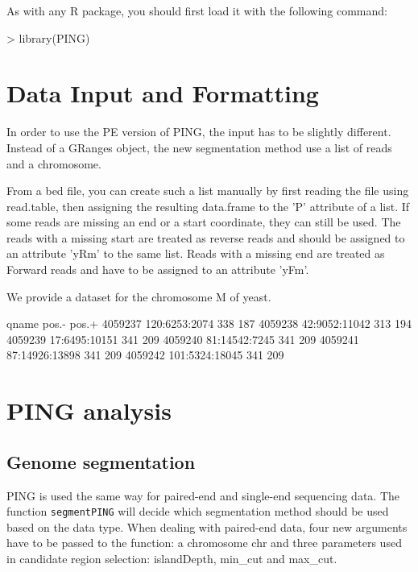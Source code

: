 \documentclass[11pt]{article}
\begin{document}
As with any R package, you should first load it with the following command:

\begin{Schunk}
\begin{Sinput}
> library(PING)
\end{Sinput}
\end{Schunk}

\section{Data Input and Formatting}
In order to use the PE version of PING, the input has to be slightly different.
Instead of a GRanges object, the new segmentation method use a list of reads and
a chromosome.

From a bed file, you can create such a list manually by first reading the file
using read.table, then assigning the resulting data.frame to the 'P' attribute
of a list. If some reads are missing an end or a start coordinate, they can
still be used. The reads with a missing start are treated as reverse reads and
should be assigned to an attribute 'yRm' to the same list. Reads with a missing
end are treated as Forward reads and have to be assigned to an attribute 'yFm'.

We provide a dataset for the chromosome M of yeast.
\begin{Schunk}
\begin{Soutput}
                 qname pos.- pos.+
4059237  120:6253:2074   338   187
4059238  42:9052:11042   313   194
4059239  17:6495:10151   341   209
4059240  81:14542:7245   341   209
4059241 87:14926:13898   341   209
4059242 101:5324:18045   341   209
\end{Soutput}
\end{Schunk}


\section{PING analysis}

\subsection{Genome segmentation}
PING is used the same way for paired-end and single-end sequencing data. The
function \texttt{segmentPING} will decide which segmentation method should be
used based on the data type. 
When dealing with paired-end data, four new arguments have to be passed to the
function: a chromosome chr and three parameters used in candidate region
selection: islandDepth, min_cut and max_cut.
\end{document}
